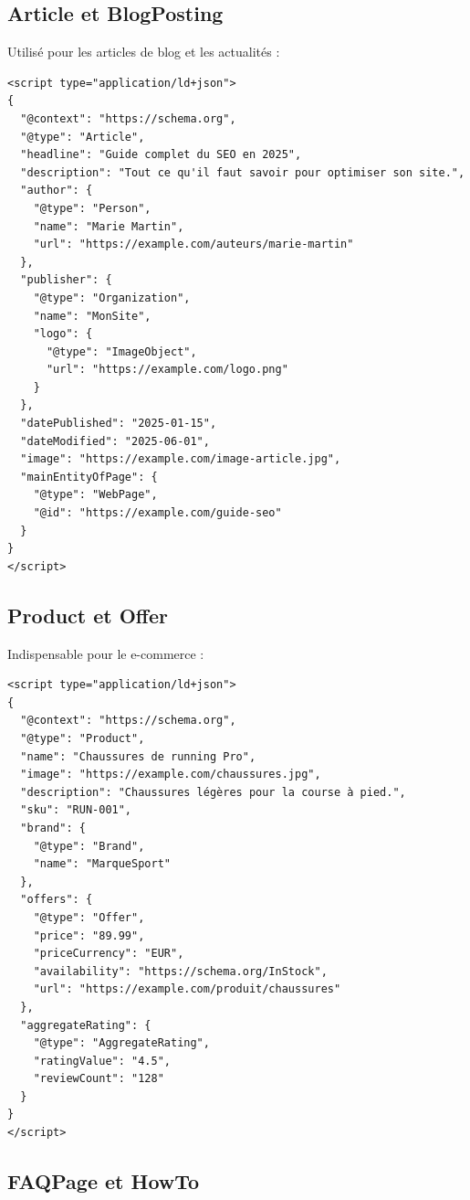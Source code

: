 \documentclass[12pt,a4paper,twoside]{report}
\begin{document}
\subsection{Article et BlogPosting}

Utilisé pour les articles de blog et les actualités :

\begin{lstlisting}[style=htmlcode,caption={Schema Article avec auteur et image}]
<script type="application/ld+json">
{
  "@context": "https://schema.org",
  "@type": "Article",
  "headline": "Guide complet du SEO en 2025",
  "description": "Tout ce qu'il faut savoir pour optimiser son site.",
  "author": {
    "@type": "Person",
    "name": "Marie Martin",
    "url": "https://example.com/auteurs/marie-martin"
  },
  "publisher": {
    "@type": "Organization",
    "name": "MonSite",
    "logo": {
      "@type": "ImageObject",
      "url": "https://example.com/logo.png"
    }
  },
  "datePublished": "2025-01-15",
  "dateModified": "2025-06-01",
  "image": "https://example.com/image-article.jpg",
  "mainEntityOfPage": {
    "@type": "WebPage",
    "@id": "https://example.com/guide-seo"
  }
}
</script>
\end{lstlisting}

\subsection{Product et Offer}

Indispensable pour le e-commerce :

\begin{lstlisting}[style=htmlcode,caption={Schema Product avec avis et prix}]
<script type="application/ld+json">
{
  "@context": "https://schema.org",
  "@type": "Product",
  "name": "Chaussures de running Pro",
  "image": "https://example.com/chaussures.jpg",
  "description": "Chaussures légères pour la course à pied.",
  "sku": "RUN-001",
  "brand": {
    "@type": "Brand",
    "name": "MarqueSport"
  },
  "offers": {
    "@type": "Offer",
    "price": "89.99",
    "priceCurrency": "EUR",
    "availability": "https://schema.org/InStock",
    "url": "https://example.com/produit/chaussures"
  },
  "aggregateRating": {
    "@type": "AggregateRating",
    "ratingValue": "4.5",
    "reviewCount": "128"
  }
}
</script>
\end{lstlisting}

\subsection{FAQPage et HowTo}
\end{document}
